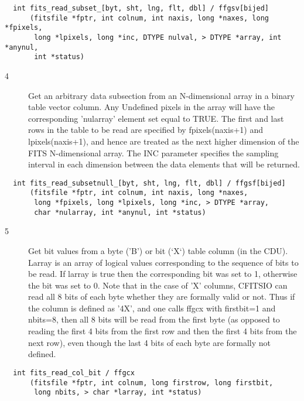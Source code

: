 \begin{verbatim}
  int fits_read_subset_[byt, sht, lng, flt, dbl] / ffgsv[bijed]
      (fitsfile *fptr, int colnum, int naxis, long *naxes, long *fpixels,
       long *lpixels, long *inc, DTYPE nulval, > DTYPE *array, int *anynul,
       int *status)
\end{verbatim}

\begin{description}
\item[4 ] Get an arbitrary data subsection from an N-dimensional array
    in a binary table vector column.  Any Undefined
    pixels in the array will have the corresponding 'nularray'
    element set equal to TRUE.  The first and last rows in the table
    to be read are specified by fpixels(naxis+1) and lpixels(naxis+1),
    and hence are treated as the next higher dimension of the FITS
    N-dimensional array.  The INC parameter specifies the sampling
    interval in each dimension between the data elements that will be
   returned.
\end{description}

\begin{verbatim}
  int fits_read_subsetnull_[byt, sht, lng, flt, dbl] / ffgsf[bijed]
      (fitsfile *fptr, int colnum, int naxis, long *naxes,
       long *fpixels, long *lpixels, long *inc, > DTYPE *array,
       char *nularray, int *anynul, int *status)
\end{verbatim}

\begin{description}
\item[5 ] Get bit values from a byte ('B') or bit (`X`) table column (in the
    CDU).  Larray is an array of logical values corresponding to the
    sequence of bits to be read.  If larray is true then the
    corresponding bit was set to 1, otherwise the bit was set to 0.
    Note that in the case of 'X' columns, CFITSIO can read  all 8 bits
    of each byte whether they are formally valid or not.  Thus if the
    column is defined as '4X', and one calls ffgcx with  firstbit=1 and
    nbits=8, then all 8 bits will be read from the first byte (as
    opposed to reading the first 4 bits from the first row and then the
    first 4 bits from the next row), even though the last 4 bits of
   each byte are formally not defined.
\end{description}

\begin{verbatim}
  int fits_read_col_bit / ffgcx
      (fitsfile *fptr, int colnum, long firstrow, long firstbit,
       long nbits, > char *larray, int *status)
\end{verbatim}

